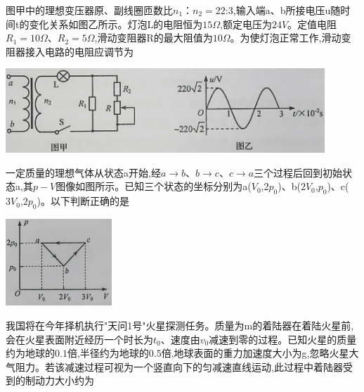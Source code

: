 \question[3]图甲中的理想变压器原、副线圈匝数比$n_1：n_2=22$:3,输入端a、b所接电压u随时间t的变化关系如图乙所示。灯泡L的电阻恒为$15Ω$,额定电压为$24V$。定值电阻$R_1=10Ω$、$R_2=5Ω$,滑动变阻器R的最大阻值为$10Ω$。为使灯泡正常工作,滑动变阻器接入电路的电阻应调节为\begin{center}\includegraphics[width=12cm]{img/image3.png}\end{center}
\begin{solution}{4cm}

\end{solution}



\question[3]一定质量的理想气体从状态a开始,经$a→b$、$b→c$、$c→a$三个过程后回到初始状态a,其$p-V$图像如图所示。已知三个状态的坐标分别为a($V_0$,$2p_0$)、b($2V_0$,$p_0$)、c($3V_0$,$2p_0$)。以下判断正确的是\begin{center}\includegraphics[width=4cm]{img/image4.png}\end{center}
\begin{solution}{4cm}

\end{solution}


\newpage
\question[3]我国将在今年择机执行"天问1号"火星探测任务。质量为m的着陆器在着陆火星前,会在火星表面附近经历一个时长为$t_0$、速度由$v_0$减速到零的过程。已知火星的质量约为地球的$0.1$倍,半径约为地球的$0.5$倍,地球表面的重力加速度大小为g,忽略火星大气阻力。若该减速过程可视为一个竖直向下的匀减速直线运动,此过程中着陆器受到的制动力大小约为
\begin{solution}{4cm}

\end{solution}



